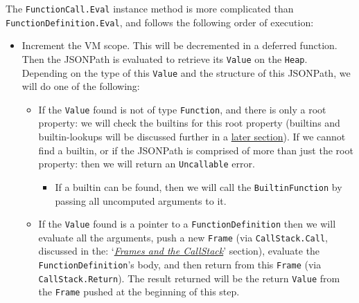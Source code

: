 The \verb|FunctionCall.Eval| instance method is more complicated than \verb|FunctionDefinition.Eval|, and follows the following order of execution:

\begin{itemize}
    \item Increment the VM scope. This will be decremented in a deferred function. Then the JSONPath is evaluated to retrieve its \verb|Value| on the \verb|Heap|. Depending on the type of this \verb|Value| and the structure of this JSONPath, we will do one of the following:
    \begin{itemize}
        \item If the \verb|Value| found is not of type \verb|Function|, and there is only a root property: we will check the builtins for this root property (builtins and builtin-lookups will be discussed further in a \hyperref[sec:development-builtins]{later section}). If we cannot find a builtin, or if the JSONPath is comprised of more than just the root property: then we will return an \verb|Uncallable| error.
        \begin{itemize}
            \item If a builtin can be found, then we will call the \verb|BuiltinFunction| by passing all uncomputed arguments to it.
        \end{itemize}
        \item If the \verb|Value| found is a pointer to a \verb|FunctionDefinition| then we will evaluate all the arguments, push a new \verb|Frame| (via \verb|CallStack.Call|, discussed in the: `\textit{\hyperref[sec:data-structures-frames-callstack]{Frames and the CallStack}}' section), evaluate the \verb|FunctionDefinition|'s body, and then return from this \verb|Frame| (via \verb|CallStack.Return|). The result returned will be the return \verb|Value| from the \verb|Frame| pushed at the beginning of this step.
    \end{itemize}
\end{itemize}
